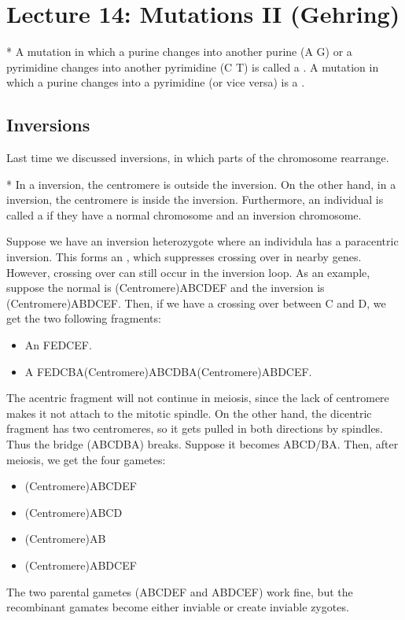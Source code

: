 \section*{Lecture 14: Mutations II (Gehring)}
\setcounter{section}{14}

\begin{defn}*
	A mutation in which a purine changes into another purine (A \leftrightarrow G) or a pyrimidine changes into another pyrimidine (C \leftrightarrow T) is called a . A mutation in which a purine changes into a pyrimidine (or vice versa) is a .
\end{defn}

\subsection{Inversions}

Last time we discussed inversions, in which parts of the chromosome rearrange. 

\begin{defn}*
	In a  inversion, the centromere is outside the inversion. On the other hand, in a  inversion, the centromere is inside the inversion. Furthermore, an individual is called a  if they have a normal chromosome and an inversion chromosome.
\end{defn}

\begin{exm}
	Suppose we have an inversion heterozygote where an individula has a paracentric inversion.
	This forms an , which suppresses crossing over in nearby genes. However, crossing over can still occur in the inversion loop.
	As an example, suppose the normal is (Centromere)ABCDEF and the inversion is (Centromere)ABDCEF. Then, if we have a crossing over between C and D, we get the two following fragments:
	\begin{itemize}
		\item An  FEDCEF.
		\item A  FEDCBA(Centromere)ABCDBA(Centromere)ABDCEF.
	\end{itemize}
	The acentric fragment will not continue in meiosis, since the lack of centromere makes it not attach to the mitotic spindle.
	On the other hand, the dicentric fragment has two centromeres, so it gets pulled in both directions by spindles.
	Thus the bridge (ABCDBA) breaks. Suppose it becomes ABCD/BA. Then, after meiosis, we get the four gametes:
	\begin{itemize}
		\item (Centromere)ABCDEF
		\item (Centromere)ABCD
		\item (Centromere)AB
		\item (Centromere)ABDCEF
	\end{itemize}
	The two parental gametes (ABCDEF and ABDCEF) work fine, but the recombinant gamates become either inviable or create inviable zygotes.
\end{exm}

